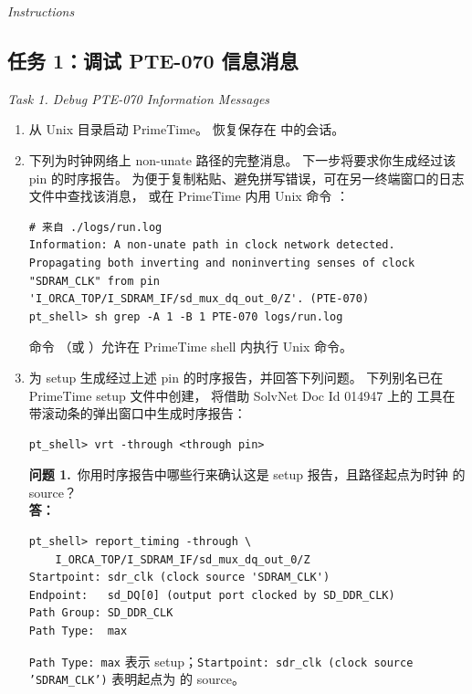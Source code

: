 \noindent\textit{Instructions}

\subsection{任务 1：调试 PTE-070 信息消息}
\label{lab5:task1}

\noindent\textit{Task 1. Debug PTE-070 Information Messages}

\begin{enumerate}
  \item 从  Unix 目录启动 PrimeTime。
        恢复保存在  中的会话。

  \item 下列为时钟网络上 non-unate 路径的完整消息。
        下一步将要求你生成经过该 pin 的时序报告。
        为便于复制粘贴、避免拼写错误，可在另一终端窗口的日志文件中查找该消息，
        或在 PrimeTime 内用 Unix 命令 ：
\begin{lstlisting}
# 来自 ./logs/run.log
Information: A non-unate path in clock network detected.
Propagating both inverting and noninverting senses of clock
"SDRAM_CLK" from pin
'I_ORCA_TOP/I_SDRAM_IF/sd_mux_dq_out_0/Z'. (PTE-070)
pt_shell> sh grep -A 1 -B 1 PTE-070 logs/run.log
\end{lstlisting}

\begin{noteBox}
命令 （或 ）允许在 PrimeTime shell 内执行 Unix 命令。
\end{noteBox}

  \item 为 setup 生成经过上述 pin 的时序报告，并回答下列问题。
        下列别名已在 PrimeTime setup 文件中创建，
        将借助 SolvNet Doc Id 014947 上的  工具在带滚动条的弹出窗口中生成时序报告：
\begin{lstlisting}
pt_shell> vrt -through <through pin>
\end{lstlisting}

\begin{questionBox}
\textbf{问题 1.}\ 你用时序报告中哪些行来确认这是 setup 报告，且路径起点为时钟  的 source？\\[0.35em]
\textbf{答：}\\
\begin{lstlisting}
pt_shell> report_timing -through \
    I_ORCA_TOP/I_SDRAM_IF/sd_mux_dq_out_0/Z
Startpoint: sdr_clk (clock source 'SDRAM_CLK')
Endpoint:   sd_DQ[0] (output port clocked by SD_DDR_CLK)
Path Group: SD_DDR_CLK
Path Type:  max
\end{lstlisting}
\texttt{Path Type: max} 表示 setup；\texttt{Startpoint: sdr\_clk (clock source 'SDRAM\_CLK')}
表明起点为 \cmd{SDRAM\_CLK} 的 source。


\end{questionBox}
\end{enumerate}

